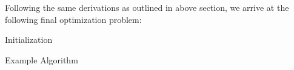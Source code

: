 Following the same derivations as outlined in above section, we arrive at the following final optimization problem:


\begin{algorithm}[H]
    \SetAlgoLined
    Initialization\;
    \caption{Example Algorithm}
\end{algorithm}

